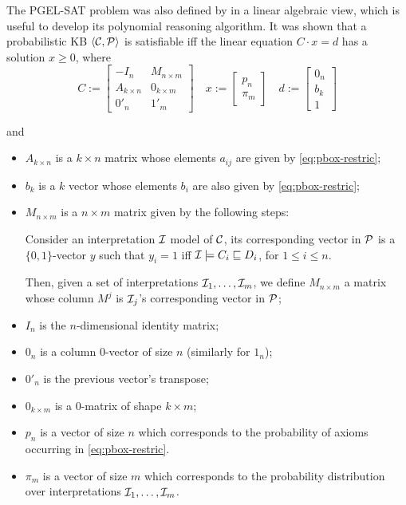 The PGEL-SAT problem was also defined by \citet{Fin2020} in a linear algebraic view, which is useful to develop its polynomial reasoning algorithm. It was shown that a probabilistic KB $\langle\mathcal{C}, \mathcal{P}\rangle$ is satisfiable iff the linear equation $C \cdot x = d$ has a solution $x \geq 0$, where
% 
\begin{equation}
	\label{pbox-linear}
	C := \begin{bmatrix}
		-I_n           & M_{n \times m} \\
		A_{k \times n} & 0_{k \times m} \\
		0'_n           & 1'_{m}
	\end{bmatrix}
	\quad
	x := \begin{bmatrix}
		p_n \\
		\pi_m
	\end{bmatrix}
	\quad
	d := \begin{bmatrix}
		0_n \\
		b_k \\
		1
	\end{bmatrix}
\end{equation}

and
\begin{itemize}
	\item $A_{k \times n}$ is a $k \times n$ matrix whose elements $a_{ij}$ are given by \autoref{eq:pbox-restric};
	\item $b_k$ is a $k$ vector whose elements $b_i$ are also given by \autoref{eq:pbox-restric};
	\item $M_{n \times m}$ is a $n \times m$ matrix given by the following steps:

	      Consider an interpretation $\mathcal{I}$ model of $\mathcal{C}$, its corresponding vector in $\mathcal{P}$ is  a $\{0, 1\}$-vector $y$ such that $y_i = 1$ iff $\mathcal{I} \models C_i \sqsubseteq D_i$, for $1 \leq i \leq n$.

	      Then, given a set of interpretations $\mathcal{I}_1, \dots, \mathcal{I}_m$, we define $M_{n \times m}$ a matrix whose column $M^j$ is $\mathcal{I}_j$'s corresponding vector in $\mathcal{P}$;
	\item $I_n$ is the $n$-dimensional identity matrix;
	\item $0_n$ is a column $0$-vector of size $n$ (similarly for $1_n$);
	\item $0'_n$ is the previous vector's transpose;
	\item $0_{k \times m}$ is a $0$-matrix of shape $k \times m$;
	\item $p_n$ is a vector of size $n$ which corresponds to the probability of axioms occurring in \autoref{eq:pbox-restric}.
	\item $\pi_m$ is a vector of size $m$ which corresponds to the probability distribution over interpretations $\mathcal{I}_1, \dots, \mathcal{I}_m$.
\end{itemize}




